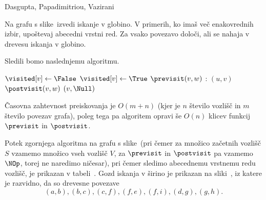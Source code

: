 \begin{naloga}%
{Dasgupta, Papadimitriou, Vazirani}{\cite[Exercise~3.1]{dpv}}
\begin{vprasanje}
Na grafu s slike~\fig[bfs] izvedi iskanje v globino.
V primerih, ko imaš več ena\-ko\-vred\-nih izbir,
upoštevaj abecedni vrstni red.
Za vsako povezavo določi, ali se nahaja v drevesu iskanja v globino.
\end{vprasanje}

\begin{odgovor}
Sledili bomo naslednjemu algoritmu.
\begin{small}
\begin{algorithmic}
		\State $\visited[v] \gets \False$
	\EndFor
        \If{$\visited[v]$}
            \State \Return
        \EndIf
        \State $\visited[v] \gets \True$
        \State $\previsit(v, w)$
		:
            $(u, v)$
		\EndFor
        \State $\postvisit(v, w)$
    \EndFunction
		$(v, \Null)$
	\EndFor
\EndFunction
\end{algorithmic}
\end{small}
Časovna zahtevnost preiskovanja je $O(m + n)$
(kjer je $n$ število vozlišč in $m$ število povezav grafa),
poleg tega pa algoritem opravi
še $O(n)$ klicev funkcij $\previsit$ in $\postvisit$.

Potek zgornjega algoritma na grafu s slike~\fig[bfs]
(pri čemer za množico za\-čet\-nih vozlišč $S$
vzamemo množico vseh vozlišč $V$,
za $\previsit$ in $\postvisit$ pa vzamemo $\NOp$,
torej ne naredimo ničesar),
pri čemer sledimo abecednemu vrstnemu redu vozlišč,
je prikazan v tabeli~\tab.
Gozd iskanja v širino je prikazan na sliki~\fig,
iz katere je razvidno, da so drevesne povezave
$$
(a, b), (b, c), (c, f), (f, e), (f, i), (d, g), (g, h).
$$


\end{odgovor}
\end{naloga}

